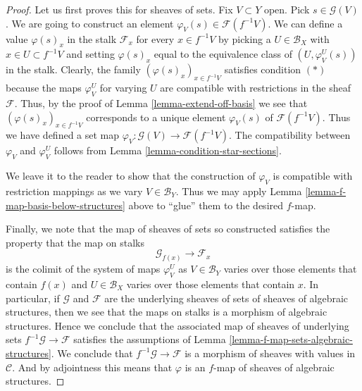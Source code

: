 \documentclass{stacks-project}
\theoremstyle{plain}
\theoremstyle{definition}
\theoremstyle{remark}
\numberwithin{equation}{subsection}
\begin{document}
\begin{proof}
Let us first proves this for sheaves of sets.
Fix $V \subset Y$ open. Pick $s \in \mathcal{G}(V)$.
We are going to construct an element
$\varphi_V(s) \in \mathcal{F}(f^{-1}V)$.
We can define a value $\varphi(s)_x$ in the stalk $\mathcal{F}_x$
for every $x \in f^{-1}V$ by picking a $U \in \mathcal{B}_X$
with $x \in U \subset f^{-1}V$ and setting $\varphi(s)_x$
equal to the equivalence class of $(U, \varphi_V^U(s))$
in the stalk. Clearly, the family $(\varphi(s)_x)_{x \in f^{-1}V}$
satisfies condition $(*)$ because the maps $\varphi_V^U$
for varying $U$
are compatible with restrictions in the sheaf $\mathcal{F}$.
Thus, by the proof of Lemma \ref{lemma-extend-off-basis}
we see that $(\varphi(s)_x)_{x \in f^{-1}V}$ corresponds
to a unique element $\varphi_V(s)$ of $\mathcal{F}(f^{-1}V)$.
Thus we have defined a set map
$\varphi_V : \mathcal{G}(V) \to \mathcal{F}(f^{-1}V)$.
The compatibility between $\varphi_V$ and $\varphi_V^U$
follows from Lemma \ref{lemma-condition-star-sections}.

\medskip\noindent
We leave it to the reader to show that the construction
of $\varphi_V$ is compatible with restriction mappings as we vary
$V \in \mathcal{B}_Y$. Thus we may apply Lemma
\ref{lemma-f-map-basis-below-structures} above to
``glue'' them to the desired $f$-map.

\medskip\noindent
Finally, we note that the map of sheaves of sets so constructed
satisfies the property that the map on stalks
$$
\mathcal{G}_{f(x)} \longrightarrow \mathcal{F}_x
$$
is the colimit of the system of maps $\varphi_V^U$ as
$V \in \mathcal{B}_Y$ varies over those elements that
contain $f(x)$ and $U \in \mathcal{B}_X$ varies over those elements that
contain $x$. In particular, if $\mathcal{G}$ and $\mathcal{F}$
are the underlying sheaves of sets of sheaves of algebraic structures,
then we see that the maps on stalks is a morphism of algebraic
structures. Hence we conclude that the associated map of
sheaves of underlying sets $f^{-1}\mathcal{G} \to \mathcal{F}$
satisfies the assumptions of
Lemma \ref{lemma-f-map-sets-algebraic-structures}.
We conclude that $f^{-1}\mathcal{G} \to \mathcal{F}$
is a morphism of sheaves with values in $\mathcal{C}$.
And by adjointness this means that $\varphi$ is
an $f$-map of sheaves of algebraic structures.
\end{proof}
\end{document}
